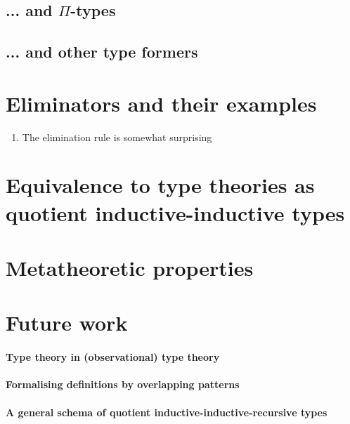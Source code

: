 \documentclass[a4paper,UKenglish,numberwithinsect,cleveref,thm-restate]{lipics-v2021}
\begin{document}
\subsection{... and \texorpdfstring{$\Pi$}{Π}-types} \label{subsec:SC+U+Pi}

\subsection{... and other type formers} \label{subsec:SC+U+Pi+more}

\section{Eliminators and their examples}
\begin{enumerate}
  \item The elimination rule is somewhat surprising
  
\end{enumerate}

\section{Equivalence to type theories as quotient inductive-inductive types}
\section{Metatheoretic properties}

\section{Future work}

\paragraph*{Type theory in (observational) type theory}

\paragraph*{Formalising definitions by overlapping patterns}

\paragraph*{A general schema of quotient inductive-inductive-recursive types}

\end{document}
